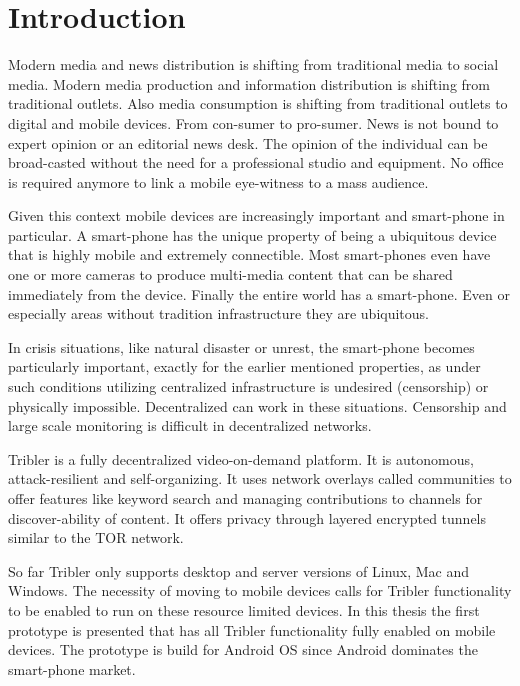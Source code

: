 \chapter{Introduction}
\label{ch:intro}

Modern media and news distribution is shifting from traditional media to social media.
Modern media production and information distribution is shifting from traditional outlets.
Also media consumption is shifting from traditional outlets to digital and mobile devices.
From con-sumer to pro-sumer.
News is not bound to expert opinion or an editorial news desk.
The opinion of the individual can be broad-casted without the need for a professional studio and equipment.
No office is required anymore to link a mobile eye-witness to a mass audience.

Given this context mobile devices are increasingly important and smart-phone in particular.
A smart-phone has the unique property of being a ubiquitous device that is highly mobile and extremely connectible.
Most smart-phones even have one or more cameras to produce multi-media content that can be shared immediately from the device.
Finally the entire world has a smart-phone.
Even or especially areas without tradition infrastructure they are ubiquitous.

In crisis situations, like natural disaster or unrest, the smart-phone becomes particularly important, exactly for the earlier mentioned properties, as under such conditions utilizing centralized infrastructure is undesired (censorship) or physically impossible.
Decentralized can work in these situations.
Censorship and large scale monitoring is difficult in decentralized networks.


Tribler is a fully decentralized video-on-demand platform.
It is autonomous, attack-resilient and self-organizing.
It uses network overlays called communities to offer features like keyword search and managing contributions to channels for discover-ability of content.
It offers privacy through layered encrypted tunnels similar to the TOR network.

So far Tribler only supports desktop and server versions of Linux, Mac and Windows.
The necessity of moving to mobile devices calls for Tribler functionality to be enabled to run on these resource limited devices.
In this thesis the first prototype is presented that has all Tribler functionality fully enabled on mobile devices.
The prototype is build for Android OS since Android dominates the smart-phone market.



